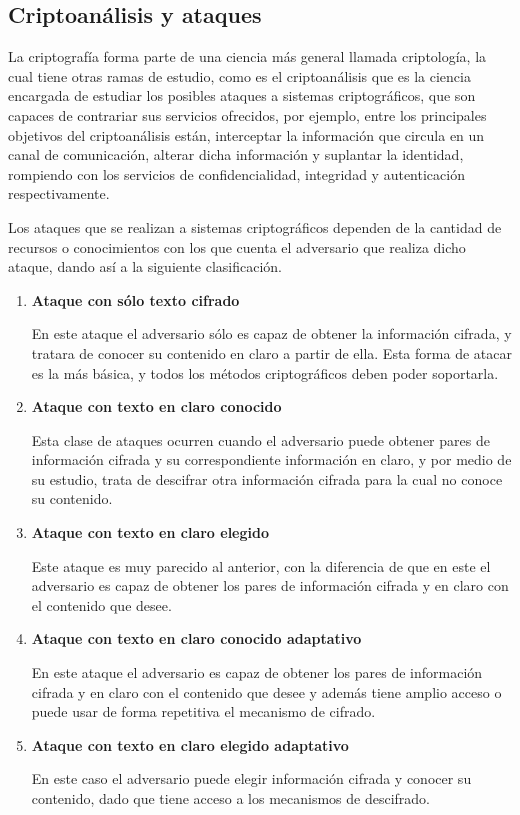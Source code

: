 
\subsection{Criptoanálisis y ataques}

  La criptografía forma parte de una ciencia más general llamada criptología, 
  la cual tiene otras ramas de estudio, como es el criptoanálisis que es la 
  ciencia encargada de estudiar los posibles ataques a sistemas criptográficos, 
  que son capaces de contrariar sus servicios ofrecidos, por ejemplo, entre los 
  principales objetivos del criptoanálisis están, interceptar la información que 
  circula en un canal de comunicación, alterar dicha información y suplantar la 
  identidad, rompiendo con los servicios de confidencialidad, integridad y 
  autenticación respectivamente.

  Los ataques que se realizan a sistemas criptográficos dependen de la cantidad 
  de recursos o conocimientos con los que cuenta el adversario que realiza dicho 
  ataque, dando así a la siguiente clasificación.

  \begin{enumerate}
 
    \item \textbf{Ataque con sólo texto cifrado}

      En este ataque el adversario sólo es capaz de obtener la información
      cifrada, y tratara de conocer su contenido en claro a partir de ella.
      Esta forma de atacar es la más básica, y todos los métodos
      criptográficos deben poder soportarla.

    \item \textbf{Ataque con texto en claro conocido}

      Esta clase de ataques ocurren cuando el adversario puede obtener pares
      de información cifrada y su correspondiente información en claro, y
      por medio de su estudio, trata de descifrar otra información cifrada
      para la cual no conoce su contenido.

    \item \textbf{Ataque con texto en claro elegido}

      Este ataque es muy parecido al anterior, con la diferencia de que en
      este el adversario es capaz de obtener los pares de información
      cifrada y en claro con el contenido que desee.

    \item \textbf{Ataque con texto en claro conocido adaptativo}

      En este ataque el adversario es capaz de obtener los pares de
      información cifrada y en claro con el contenido que desee y además
      tiene amplio acceso o puede usar de forma repetitiva el mecanismo de
      cifrado.

    \item \textbf{Ataque con texto en claro elegido adaptativo}

      En este caso el adversario puede elegir información cifrada y conocer
      su contenido, dado que tiene acceso a los mecanismos de descifrado.

  \end{enumerate}
